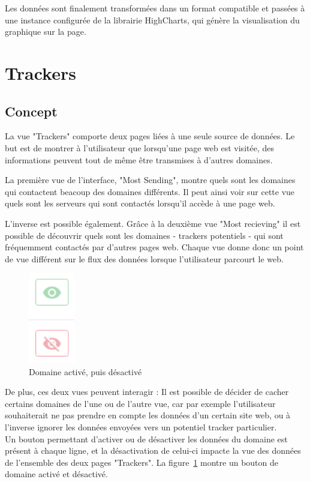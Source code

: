 			Les données sont finalement transformées dans un format compatible et passées à une instance configurée de la librairie HighCharts, qui génère la visualisation du graphique sur la page.

\clearpage

%
%
%
%

\section{Trackers}

	\subsection{Concept}

		La vue "Trackers" comporte deux pages liées à une seule source de données. Le but est de montrer à l'utilisateur que lorsqu'une page web est visitée, des informations peuvent tout de même être transmises à d'autres domaines.

		La première vue de l'interface, "Most Sending", montre quels sont les domaines qui contactent beacoup des domaines différents. Il peut ainsi voir sur cette vue quels sont les serveurs qui sont contactés lorsqu'il accède à une page web.

		L'inverse est possible également. Grâce à la deuxième vue "Most recieving" il est possible de découvrir quels sont les domaines - trackers potentiels - qui sont fréquemment contactés par d'autres pages web. Chaque vue donne donc un point de vue différent sur le flux des données lorsque l'utilisateur parcourt le web.

		\begin{figure}
			\includegraphics[width=2cm]{images/design/pages/trackers_button}
			\caption{Domaine activé, puis désactivé}\label{d-buttons}
		\end{figure} 

		De plus, ces deux vues peuvent interagir : Il est possible de décider de cacher certains domaines de l'une ou de l'autre vue, car par exemple l'utilisateur souhaiterait ne pas prendre en compte les données d'un certain site web, ou à l'inverse ignorer les données envoyées vers un potentiel tracker particulier.\\
		Un bouton permettant d'activer ou de désactiver les données du domaine est présent à chaque ligne, et la désactivation de celui-ci impacte la vue des données de l'ensemble des deux pages "Trackers". La figure~\ref{d-buttons} montre un bouton de domaine activé et désactivé.
		
